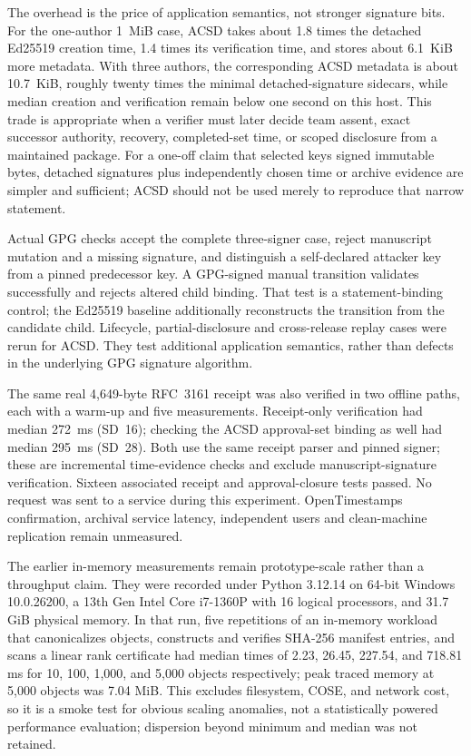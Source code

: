 \documentclass[conference,compsoc]{IEEEtran}
\begin{document}
The overhead is the price of application semantics, not stronger signature
bits. For the one-author 1~MiB case, ACSD takes about 1.8 times the detached
Ed25519 creation time, 1.4 times its verification time, and stores about 6.1~KiB
more metadata. With three authors, the corresponding ACSD metadata is about
10.7~KiB, roughly twenty times the minimal detached-signature sidecars, while
median creation and verification remain below one second on this host. This
trade is appropriate when a verifier must later decide team assent, exact
successor authority, recovery, completed-set time, or scoped disclosure from a
maintained package. For a one-off claim that selected keys signed immutable
bytes, detached signatures plus independently chosen time or archive evidence
are simpler and sufficient; ACSD should not be used merely to reproduce that
narrow statement.

Actual GPG checks accept the complete three-signer case, reject manuscript
mutation and a missing signature, and distinguish a self-declared attacker
key from a pinned predecessor key. A GPG-signed manual transition validates
successfully and rejects altered child binding. That test is a statement-binding
control; the Ed25519 baseline additionally reconstructs the transition from the
candidate child. Lifecycle, partial-disclosure and cross-release replay cases
were rerun for ACSD. They test additional application semantics, rather than
defects in the underlying GPG signature algorithm.

The same real 4,649-byte RFC~3161 receipt was also verified in two offline
paths, each with a warm-up and five measurements. Receipt-only verification
had median 272~ms (SD~16); checking the ACSD approval-set binding as well had
median 295~ms (SD~28). Both use the same receipt parser and pinned signer;
these are incremental time-evidence checks and exclude manuscript-signature
verification. Sixteen associated receipt and approval-closure tests passed.
No request was sent to a service during this experiment. OpenTimestamps
confirmation, archival service latency, independent users and clean-machine
replication remain unmeasured.


The earlier in-memory measurements remain prototype-scale rather than a throughput claim. They
were recorded under Python 3.12.14 on 64-bit Windows 10.0.26200, a 13th Gen
Intel Core i7-1360P with 16 logical processors, and 31.7 GiB physical memory.
In that run, five repetitions of an in-memory workload that canonicalizes
objects, constructs and verifies SHA-256 manifest entries, and scans a linear
rank certificate had median times of 2.23, 26.45, 227.54, and 718.81 ms for
10, 100, 1,000, and 5,000 objects respectively; peak traced memory at 5,000
objects was 7.04 MiB. This excludes filesystem, COSE, and network cost, so it
is a smoke test for obvious scaling anomalies, not a statistically powered
performance evaluation; dispersion beyond minimum and median was not retained.
\end{document}
